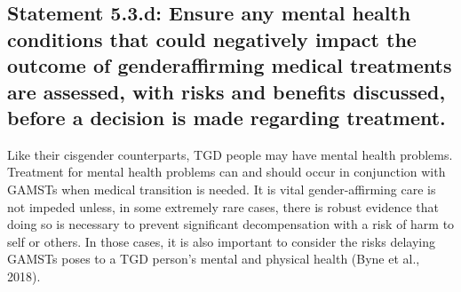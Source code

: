 \documentclass[
]{book}
\begin{document}
\hypertarget{statement-5.3.d-ensure-any-mental-health-conditions-that-could-negatively-impact-the-outcome-of-genderaffirming-medical-treatments-are-assessed-with-risks-and-benefits-discussed-before-a-decision-is-made-regarding-treatment.}{%
\subsection*{Statement 5.3.d: Ensure any mental health conditions that could negatively impact the outcome of genderaffirming medical treatments are assessed, with risks and benefits discussed, before a decision is made regarding treatment.}\label{statement-5.3.d-ensure-any-mental-health-conditions-that-could-negatively-impact-the-outcome-of-genderaffirming-medical-treatments-are-assessed-with-risks-and-benefits-discussed-before-a-decision-is-made-regarding-treatment.}}

Like their cisgender counterparts, TGD people may have mental health problems. Treatment
for mental health problems can and should
occur in conjunction with GAMSTs when medical transition is needed. It is vital
gender-affirming care is not impeded unless, in
some extremely rare cases, there is robust evidence that doing so is necessary to prevent
significant decompensation with a risk of harm
to self or others. In those cases, it is also
important to consider the risks delaying
GAMSTs poses to a TGD person's mental and
physical health (Byne et al., 2018).
\end{document}
